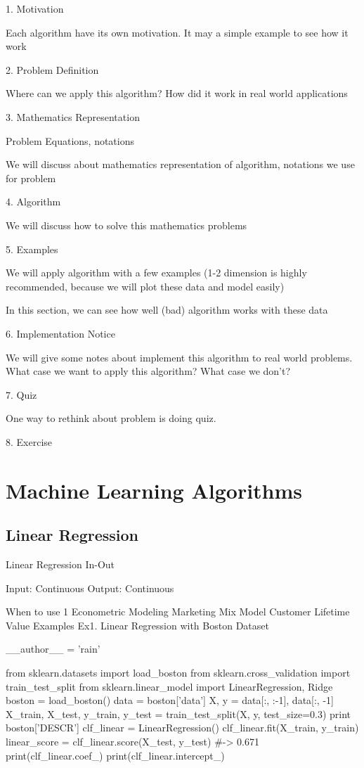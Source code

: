 1. Motivation

Each algorithm have its own motivation. It may a simple example to see how it work

2. Problem Definition

Where can we apply this algorithm? How did it work in real world applications

3. Mathematics Representation

Problem Equations, notations

We will discuss about mathematics representation of algorithm, notations we use for problem

4. Algorithm

We will discuss how to solve this mathematics problems

5. Examples

We will apply algorithm with a few examples (1-2 dimension is highly recommended, because we will plot these data and model easily)

In this section, we can see how well (bad) algorithm works with these data

6. Implementation Notice

We will give some notes about implement this algorithm to real world problems. What case we want to apply this algorithm? What case we don't?

7. Quiz

One way to rethink about problem is doing quiz.

8. Exercise

\section{Machine Learning Algorithms}

\subsection{Linear Regression}

Linear Regression
In-Out


Input: Continuous Output: Continuous

When to use 1
Econometric Modeling
Marketing Mix Model
Customer Lifetime Value
Examples
Ex1. Linear Regression with Boston Dataset

__author__ = 'rain'

from sklearn.datasets import load_boston
from sklearn.cross_validation import train_test_split
from sklearn.linear_model import LinearRegression, Ridge
boston = load_boston()
data = boston['data']
X, y = data[:, :-1], data[:, -1]
X_train, X_test, y_train, y_test =
  train_test_split(X, y, test_size=0.3)
print boston['DESCR']
clf_linear = LinearRegression()
clf_linear.fit(X_train, y_train)
linear_score = clf_linear.score(X_test, y_test)
#-> 0.671
print(clf_linear.coef_)
print(clf_linear.intercept_)

